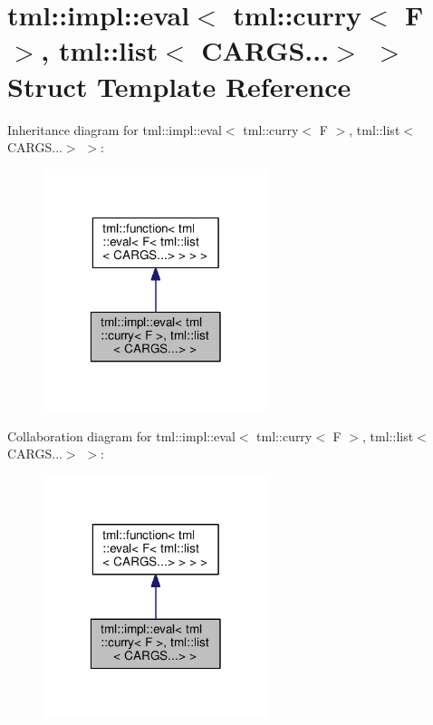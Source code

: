 \hypertarget{structtml_1_1impl_1_1eval_3_01tml_1_1curry_3_01_f_01_4_00_01tml_1_1list_3_01_c_a_r_g_s_8_8_8_4_01_4}{\section{tml\+:\+:impl\+:\+:eval$<$ tml\+:\+:curry$<$ F $>$, tml\+:\+:list$<$ C\+A\+R\+G\+S...$>$ $>$ Struct Template Reference}
\label{structtml_1_1impl_1_1eval_3_01tml_1_1curry_3_01_f_01_4_00_01tml_1_1list_3_01_c_a_r_g_s_8_8_8_4_01_4}
}


Inheritance diagram for tml\+:\+:impl\+:\+:eval$<$ tml\+:\+:curry$<$ F $>$, tml\+:\+:list$<$ C\+A\+R\+G\+S...$>$ $>$\+:
\nopagebreak
\begin{figure}[H]
\begin{center}
\leavevmode
\includegraphics[width=186pt]{structtml_1_1impl_1_1eval_3_01tml_1_1curry_3_01_f_01_4_00_01tml_1_1list_3_01_c_a_r_g_s_8_8_8_4_01_4__inherit__graph}
\end{center}
\end{figure}


Collaboration diagram for tml\+:\+:impl\+:\+:eval$<$ tml\+:\+:curry$<$ F $>$, tml\+:\+:list$<$ C\+A\+R\+G\+S...$>$ $>$\+:
\nopagebreak
\begin{figure}[H]
\begin{center}
\leavevmode
\includegraphics[width=186pt]{structtml_1_1impl_1_1eval_3_01tml_1_1curry_3_01_f_01_4_00_01tml_1_1list_3_01_c_a_r_g_s_8_8_8_4_01_4__coll__graph}
\end{center}
\end{figure}
